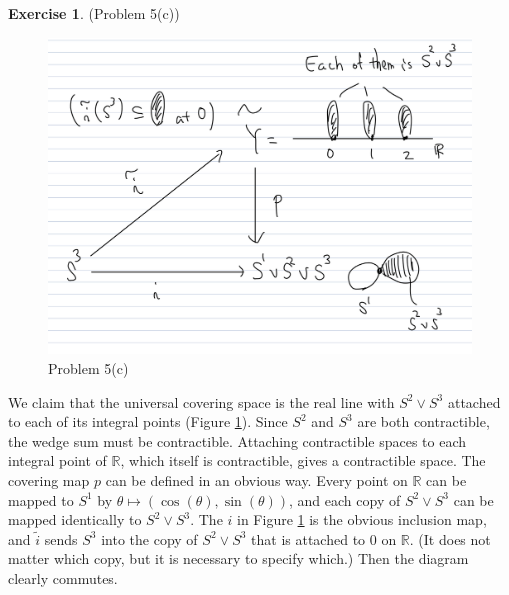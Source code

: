 \documentclass[12pt, psamsfonts]{amsart}
\theoremstyle{definition}
\newtheorem*{exer}{Exercise}
\theoremstyle{remark}
\numberwithin{equation}{section}
\begin{document}
\begin{exer}{(Problem 5(c))}
  \begin{figure}[!htb]
    \includegraphics[width=.8\linewidth]{problem5_c.jpeg}
    \caption{Problem 5(c)}
    \label{fig:5c}
  \end{figure}
  We claim that the universal covering space is the real line with $S^2 \vee S^3$ attached to each of its integral points (Figure \ref{fig:5c}).
  Since $S^2$ and $S^3$ are both contractible, the wedge sum must be contractible.
  Attaching contractible spaces to each integral point of $\mathbb{R}$, which itself is contractible, gives a contractible space.
  The covering map $p$ can be defined in an obvious way.
  Every point on $\mathbb{R}$ can be mapped to $S^1$ by $\theta \mapsto (\cos(\theta), \sin(\theta))$, and each copy of $S^2 \vee S^3$ can be mapped identically to $S^2 \vee S^3$.
  The $i$ in Figure \ref{fig:5c} is the obvious inclusion map, and $\tilde{i}$ sends $S^3$ into the copy of $S^2 \vee S^3$ that is attached to 0 on $\mathbb{R}$.
  (It does not matter which copy, but it is necessary to specify which.)
  Then the diagram clearly commutes.


\end{exer}
\end{document}
